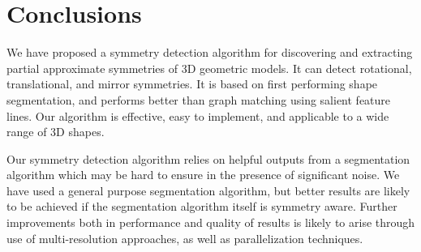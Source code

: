 \section{Conclusions}
\label{sec:con}

We have proposed a symmetry detection algorithm for discovering and extracting partial approximate symmetries of 3D geometric models.
It can detect  rotational, translational, and mirror symmetries.
It is based on first performing shape segmentation, and performs better than graph matching using salient feature lines.
Our algorithm is effective, easy to implement, and applicable to a wide range of 3D shapes.

Our symmetry detection algorithm relies on helpful outputs from a segmentation algorithm
which may be hard to ensure in the presence of significant noise. 
We have used a general purpose segmentation algorithm, but better results are likely to be achieved if the 
segmentation algorithm itself is symmetry aware.
Further improvements both in performance and quality of results
is likely to arise through use of  multi-resolution approaches, as well as  parallelization
techniques.


